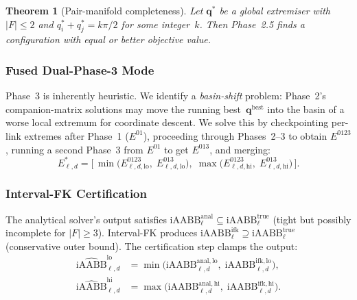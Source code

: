 \documentclass[journal]{IEEEtran}
\newtheorem{theorem}{Theorem}
\newcommand{\iAABB}{\text{iAABB}}
\begin{document}
\begin{theorem}[Pair-manifold completeness]\label{thm:pair_complete}
Let $\bm{q}^*$ be a global extremiser with
$|F| \leq 2$ and $q_i^* + q_j^* = k\pi/2$ for some integer~$k$.
Then Phase~2.5 finds a configuration with equal or better objective
value.
\end{theorem}


\subsubsection{Fused Dual-Phase-3 Mode}\label{sec:dual_phase3}

Phase~3 is inherently heuristic.
We identify a \emph{basin-shift} problem: Phase~2's companion-matrix
solutions may move the running best~$\bm{q}^\text{best}$ into the basin
of a worse local extremum for coordinate descent.
We solve this by checkpointing per-link extremes after Phase~1
($E^{01}$), proceeding through Phases~2--3 to obtain $E^{0123}$,
running a second Phase~3 from $E^{01}$ to get $E^{013}$,
and merging:
\begin{equation}\label{eq:dual_merge}
  E^*_{\ell,d} = \bigl[\,
    \min\!\bigl(E^{0123}_{\ell,d,\mathrm{lo}},\;
                E^{013}_{\ell,d,\mathrm{lo}}\bigr),\;
    \max\!\bigl(E^{0123}_{\ell,d,\mathrm{hi}},\;
                E^{013}_{\ell,d,\mathrm{hi}}\bigr)
  \,\bigr].
\end{equation}


\subsubsection{Interval-FK Certification}\label{sec:ifk_cert}

The analytical solver's output satisfies
$\iAABB^{\mathrm{anal}}_\ell \subseteq \iAABB^{\mathrm{true}}_\ell$
(tight but possibly incomplete for $|F| \geq 3$).
Interval-FK produces
$\iAABB^{\mathrm{ifk}}_\ell \supseteq \iAABB^{\mathrm{true}}_\ell$
(conservative outer bound).
The certification step clamps the output:
\begin{equation}\label{eq:cert_clamp}
  \begin{aligned}
    \widehat{\iAABB}_{\ell,d}^{\mathrm{lo}}
      &= \min\!\bigl(\iAABB_{\ell,d}^{\mathrm{anal,lo}},\;
                       \iAABB_{\ell,d}^{\mathrm{ifk,lo}}\bigr), \\
    \widehat{\iAABB}_{\ell,d}^{\mathrm{hi}}
      &= \max\!\bigl(\iAABB_{\ell,d}^{\mathrm{anal,hi}},\;
                       \iAABB_{\ell,d}^{\mathrm{ifk,hi}}\bigr).
  \end{aligned}
\end{equation}
\end{document}
